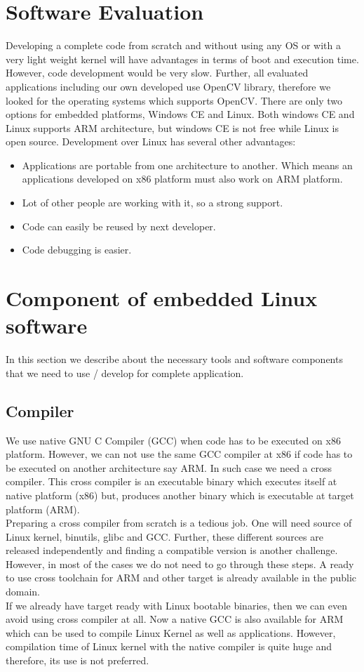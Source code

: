 \section {Software Evaluation}
\indent Developing a complete code from scratch and without using any OS
or with a very light weight kernel will have advantages in terms of boot
and execution time. However, code development would be very slow. Further,
all evaluated applications including our own developed use
OpenCV library, therefore we looked for the operating systems which
supports OpenCV. There are only two options for embedded platforms,
Windows CE and Linux. Both windows CE and Linux supports ARM
architecture, but windows CE is not free while Linux is open source.
Development over Linux has several other advantages:
\begin{itemize}
	\item Applications are portable from one architecture to
		another. Which means an applications developed on x86
		platform must also work on ARM platform.
	\item Lot of other people are working with it, so a strong
		support.
	\item Code can easily be reused by next developer.
	\item Code debugging is easier.
\end{itemize}
\section {Component of embedded Linux software}
In this section we describe about the necessary tools and software
components that we need to use / develop for complete application.
\subsection {Compiler}
\indent We use native GNU C Compiler (GCC) when code has to be executed
on x86 platform. However, we can not use the same GCC compiler at x86 if
code has to be executed on another architecture say ARM. In such case we
need a cross compiler. This cross compiler is an executable binary which
executes itself at native platform (x86) but, produces another
binary which is executable at target platform (ARM).\\
\indent Preparing a cross compiler from scratch is a tedious job. One
will need source of Linux kernel, binutils, glibc and GCC. Further,
these different sources are released independently and finding a
compatible version is another challenge. However, in most of the cases
we do not need to go through these steps. A ready to use cross toolchain
for ARM and other target is already available in the public domain.\\
\indent If we already have target ready with Linux bootable binaries,
then we can even avoid using cross compiler at all. Now a native GCC is
also available for ARM which can be used to compile Linux Kernel as well
as applications. However, compilation time of Linux kernel with the
native compiler is quite huge and therefore, its use is not preferred.
